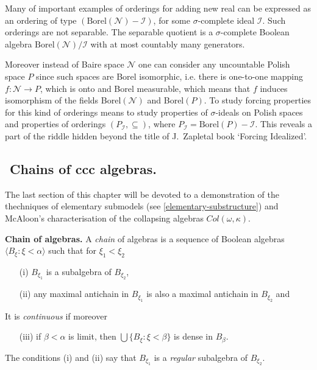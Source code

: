 Many of important examples of orderings for adding new real can be expressed
as an ordering of type $(\mbox{Borel}(\mathcal N) - \mathcal I)$, for some
$\sigma$-complete ideal $\mathcal I$. Such orderings are not separable. The
separable quotient is a $\sigma$-complete Boolean algebra
$\mbox{Borel}(\mathcal N) / \mathcal I$ with at most countably many generators.

Moreover instead of Baire space $\mathcal N$ one can consider any uncountable
Polish space $P$ since such spaces are Borel isomorphic, i.e. there is
one-to-one mapping $f: \mathcal N \rightarrow P$, which is onto and Borel
measurable, which means that $f$ induces isomorphism of the fields
Borel$(\mathcal N)$ and Borel$(P)$. To study forcing properties for
this kind of orderings means to study properties of $\sigma$-ideals on
Polish spaces and properties of orderings $(P_\mathcal I, \subseteq)$,
where $P_\mathcal I = \mbox{Borel}(P) - \mathcal I$. This reveals
a part of the riddle hidden  beyond the title of J.~Zapletal
book `Forcing Idealized'.

\subsection{${}$ \hspace{-1em} Chains of ccc algebras.}
The last section of this chapter will be devoted to a demonstration of the
thechniques of elementary submodels (see \ref{elementary-substructure}) and McAloon's characterisation of the collapsing
algebras $Col(\omega,\kappa)$.

\begin{definition}{\bf Chain of algebras.} A \emph{chain} of algebras is a sequence of Boolean algebras
$\langle B_\xi:\xi<\alpha\rangle$
such that for $\xi_1<\xi_2$
\begin{itemize}
\item[(i)] $B_{\xi_1}$ is a subalgebra of $B_{\xi_2}$,
\item[(ii)] any maximal antichain in $B_{\xi_1}$ is also a maximal antichain in $B_{\xi_2}$ and
\end{itemize}
It is \emph{continuous} if moreover
\begin{itemize}
\item[(iii)] if $\beta<\alpha$ is limit, then $\bigcup\{B_\xi:\xi<\beta\}$ is dense in $B_\beta$.
\end{itemize}
\end{definition}

The conditions (i) and (ii) say that $B_{\xi_1}$ is a \emph{regular} subalgebra of $B_{\xi_2}$.



